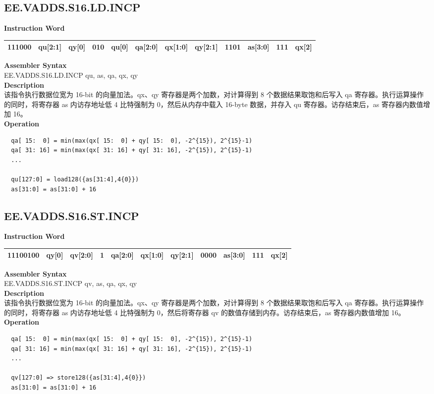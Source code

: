 \clearpage
\subsection{EE.VADDS.S16.LD.INCP}\label{instruction:EEVADDSS16LDINCP}
\setlength\tabcolsep{6pt}
\textbf{Instruction Word} \\
\begin{tabular}{|c|c|c|c|c|c|c|c|c|c|c|c|}
	\hline
	111000 & qu[2:1] & qy[0] & 010 & qu[0] & qa[2:0] & qx[1:0] & qy[2:1] & 1101 & as[3:0] & 111 & qx[2] \\
	\hline
\end{tabular}

\textbf{Assembler Syntax} \\
EE.VADDS.S16.LD.INCP qu, as, qa, qx, qy \\
\textbf{Description} \\
该指令执行数据位宽为 16-bit 的向量加法。qx、qy 寄存器是两个加数，对计算得到 8 个数据结果取饱和后写入 qa 寄存器。执行运算操作的同时，将寄存器 as 内访存地址低 4 比特强制为 0，然后从内存中载入 16-byte 数据，并存入 qu 寄存器。访存结束后，as 寄存器内数值增加 16。\\
\textbf{Operation}
\begin{lstlisting}
  qa[ 15:  0] = min(max(qx[ 15:  0] + qy[ 15:  0], -2^{15}), 2^{15}-1)
  qa[ 31: 16] = min(max(qx[ 31: 16] + qy[ 31: 16], -2^{15}), 2^{15}-1)
  ...

  qu[127:0] = load128({as[31:4],4{0}})
  as[31:0] = as[31:0] + 16
\end{lstlisting}

\clearpage
\subsection{EE.VADDS.S16.ST.INCP}\label{instruction:EEVADDSS16STINCP}
\setlength\tabcolsep{6pt}
\textbf{Instruction Word} \\
\begin{tabular}{|c|c|c|c|c|c|c|c|c|c|c|}
	\hline
	11100100 & qy[0] & qv[2:0] & 1 & qa[2:0] & qx[1:0] & qy[2:1] & 0000 & as[3:0] & 111 & qx[2] \\
	\hline
\end{tabular}

\textbf{Assembler Syntax} \\
EE.VADDS.S16.ST.INCP qv, as, qa, qx, qy \\
\textbf{Description} \\
该指令执行数据位宽为 16-bit 的向量加法。qx、qy 寄存器是两个加数，对计算得到 8 个数据结果取饱和后写入 qa 寄存器。执行运算操作的同时，将寄存器 as 内访存地址低 4 比特强制为 0，然后将寄存器 qv 的数值存储到内存。访存结束后，as 寄存器内数值增加 16。\\
\textbf{Operation}
\begin{lstlisting}
  qa[ 15:  0] = min(max(qx[ 15:  0] + qy[ 15:  0], -2^{15}), 2^{15}-1)
  qa[ 31: 16] = min(max(qx[ 31: 16] + qy[ 31: 16], -2^{15}), 2^{15}-1)
  ...

  qv[127:0] => store128({as[31:4],4{0}})
  as[31:0] = as[31:0] + 16
\end{lstlisting}

